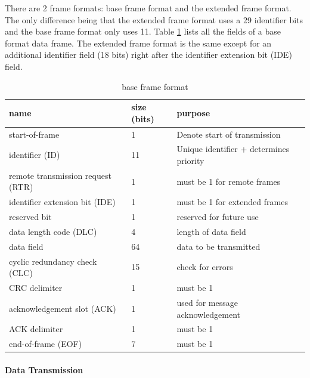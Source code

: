\documentclass[master=cws,masteroption=vs,english]{kulemt}
\begin{document}
There are 2 frame formats: base frame format and the extended frame format. The only difference being that the extended frame format uses a 29 identifier bits and the base frame format only uses 11. Table \ref{table:1} lists all the fields of a base format data frame. The extended frame format is the same except for an additional identifier field (18 bits) right after the identifier extension bit (IDE) field.

\begin{table}[]
	\begin{tabular}{|l|l|l|}
		\hline
		\rowcolor[HTML]{9B9B9B} 
		name & size (bits) & purpose \\ \hline
		start-of-frame & 1 & Denote start of transmission \\ \hline
		identifier (ID) & 11 & Unique identifier + determines priority \\ \hline
		remote transmission request (RTR) & 1 & must be 1 for remote frames \\ \hline
		identifier extension bit (IDE) & 1 & must be 1 for extended frames \\ \hline
		reserved bit & 1 & reserved for future use \\ \hline
		data length code (DLC) & 4 & length of data field \\ \hline
		data field & 64 & data to be transmitted \\ \hline
		cyclic redundancy check (CLC) & 15 & check for errors \footnotemark  \\ \hline
		CRC delimiter & 1 &  must be 1 \\ \hline
		acknowledgement slot (ACK) & 1 & used for message acknowledgement \\ \hline
		ACK delimiter & 1 & must be 1 \\ \hline
		end-of-frame (EOF) & 7 & must be 1  \\ \hline
	\end{tabular}
\caption{base frame format \cite{wiki:CAN}}
\label{table:1}
\end{table}


\paragraph{Data Transmission}
\end{document}

